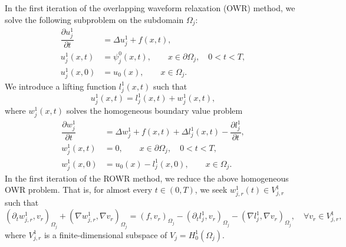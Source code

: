 \documentclass[a4paper, 11pt]{article}
\theoremstyle{remark}
\begin{document}
\vspace{10pt}
\noindent In the first iteration of the overlapping waveform relaxation (OWR) method, we solve the following subproblem on the subdomain $\Omega_{j}$:
\begin{align*}
    \dfrac{\partial u_{j}^{1}}{\partial t} &= \Delta u_{j}^{1} + f(x, t),\\
    u_{j}^{1}(x, t) &= \psi_{j}^{0}(x, t), \qquad x\in \partial\Omega_{j}, \quad 0<t<T,\\
    u_{j}^{1}(x, 0) &= u_{0}(x), \qquad x\in \Omega_{j}.
\end{align*}
We introduce a lifting function $l_{j}^{1}(x, t)$ such that
\begin{equation*}
    u_{j}^{1}(x, t) = l_{j}^{1}(x, t) + w_{j}^{1}(x, t),
\end{equation*}
where $w_{j}^{1}(x, t)$ solves the homogeneous boundary value problem
\begin{align*}
    \dfrac{\partial w_{j}^{1}}{\partial t} &= \Delta w_{j}^{1} + f(x, t) + \Delta l_{j}^{1}(x, t) - \dfrac{\partial l_{j}^{1}}{\partial t},\\
    w_{j}^{1}(x, t) &= 0, \qquad x\in \partial\Omega_{j}, \quad 0<t<T,\\
    w_{j}^{1}(x, 0) &= u_{0}(x) - l_{j}^{1}(x, 0), \qquad x\in \Omega_{j}.
\end{align*}
In the first iteration of the ROWR method, we reduce the above homogeneous OWR problem. That is, for almost every $t \in (0,T)$, we seek $w_{j, r}^{1}(t) \in V^{1}_{j, r}$ such that
\begin{equation*}
    \left(\partial_{t} w_{j, r}^{1}, v_{r}\right)_{\Omega_{j}} + \left(\nabla w_{j, r}^{1}, \nabla v_{r}\right)_{\Omega_{j}} = \left(f, v_{r}\right)_{\Omega_{j}} - \left(\partial_{t} l_{j}^{1}, v_{r}\right)_{\Omega_{j}} - \left(\nabla l_{j}^{1}, \nabla v_{r}\right)_{\Omega_{j}}, \quad\forall v_{r}\in V^{1}_{j, r},
\end{equation*}
where $V^{1}_{j, r}$ is a finite-dimensional subspace of $V_{j} = H^{1}_{0}(\Omega_{j})$. 
\end{document}
